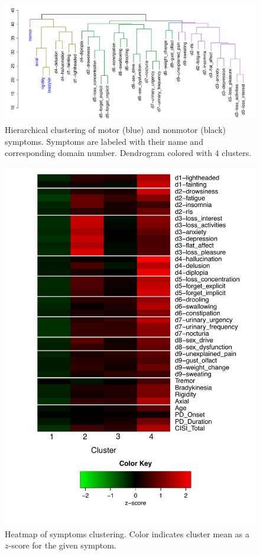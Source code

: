 \documentclass[preprint,5p]{elsarticle} %
\begin{document}
\begin{figure}[t]
  \centering
  \includegraphics[width=\linewidth]{nms30m-colhc-pub.pdf}
  \caption{Hierarchical clustering of motor (blue) and nonmotor (black) symptoms. Symptoms are
  labeled with their name and corresponding domain number. Dendrogram colored with 4 clusters.}
  \label{fig:hc}
\end{figure}

\begin{figure}[p]
  \centering
  \includegraphics[width=0.7\linewidth]{nms30-hm-pub.pdf}
  \caption{Heatmap of symptoms clustering. Color indicates cluster mean as a $z$-score for the
  given symptom.}
  \label{fig:nms30-hm}
\end{figure}
\end{document}
